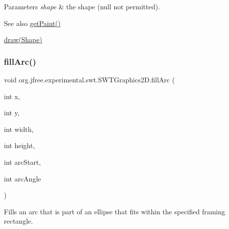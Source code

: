 \begin{DoxyParams}{Parameters}
{\em shape} & the shape ({\ttfamily null} not permitted).\\
\hline
\end{DoxyParams}
\begin{DoxySeeAlso}{See also}
\mbox{\hyperlink{classorg_1_1jfree_1_1experimental_1_1swt_1_1_s_w_t_graphics2_d_a89618656bba11128fda80e24a4b944a8}{get\+Paint()}} 

\mbox{\hyperlink{classorg_1_1jfree_1_1experimental_1_1swt_1_1_s_w_t_graphics2_d_a37f194899d6d51e6c4e9d81699e0e4f5}{draw(\+Shape)}} 
\end{DoxySeeAlso}
\mbox{\label{classorg_1_1jfree_1_1experimental_1_1swt_1_1_s_w_t_graphics2_d_a7c36e5f4afcf2bdfcce4da8c6b311921}} 
\subsubsection{\texorpdfstring{fill\+Arc()}{fillArc()}}
{\footnotesize\ttfamily void org.\+jfree.\+experimental.\+swt.\+S\+W\+T\+Graphics2\+D.\+fill\+Arc (\begin{DoxyParamCaption}\item[{int}]{x,  }\item[{int}]{y,  }\item[{int}]{width,  }\item[{int}]{height,  }\item[{int}]{arc\+Start,  }\item[{int}]{arc\+Angle }\end{DoxyParamCaption})}

Fills an arc that is part of an ellipse that fits within the specified framing rectangle.


